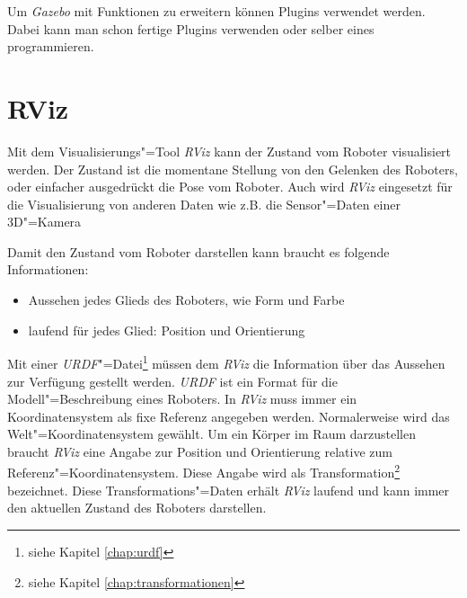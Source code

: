 Um \textit{Gazebo} mit Funktionen zu erweitern können Plugins verwendet werden.
Dabei kann man schon fertige Plugins verwenden oder selber eines programmieren. %

\section{RViz}
\label{chap:rviz}
Mit dem Visualisierungs"=Tool \textit{RViz} kann der Zustand vom Roboter visualisiert werden.
Der Zustand ist die momentane Stellung von den Gelenken des Roboters, oder einfacher ausgedrückt die Pose vom Roboter.
Auch wird \textit{RViz} eingesetzt für die Visualisierung von anderen Daten wie z.B. die Sensor"=Daten einer 3D"=Kamera

Damit  den Zustand vom Roboter darstellen kann braucht es folgende Informationen:
\begin{itemize}
\item Aussehen jedes Glieds des Roboters, wie Form und Farbe 
\item laufend für jedes Glied: Position und Orientierung
\end{itemize}

Mit einer \textit{URDF}"=Datei\footnote{siehe Kapitel \ref{chap:urdf}} müssen dem \textit{RViz} die Information über das Aussehen zur Verfügung gestellt werden.
\textit{URDF} ist ein Format für die Modell"=Beschreibung eines Roboters.
In \textit{RViz} muss immer ein Koordinatensystem als fixe Referenz angegeben werden.
Normalerweise wird das Welt"=Koordinatensystem gewählt.
Um ein Körper im Raum darzustellen braucht \textit{RViz} eine Angabe zur Position und Orientierung relative zum Referenz"=Koordinatensystem.
Diese Angabe wird als Transformation\footnote{siehe Kapitel \ref{chap:transformationen}} bezeichnet.
Diese Transformations"=Daten erhält \textit{RViz} laufend und kann immer den aktuellen Zustand des Roboters darstellen.

